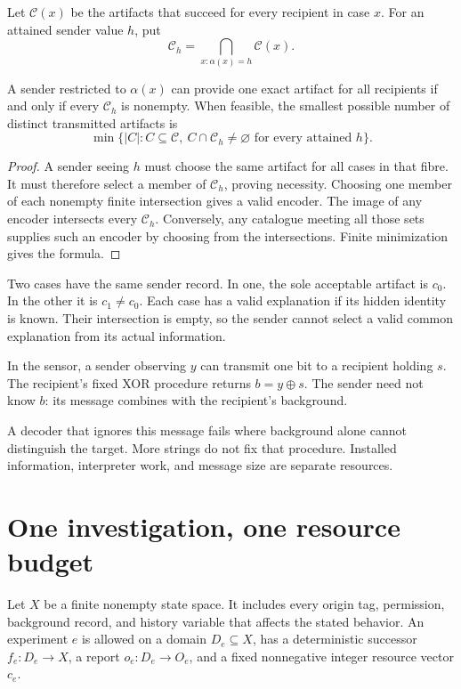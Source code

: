 Let $\mathcal C(x)$ be the artifacts that succeed for every recipient in case $x$. For an attained sender value $h$, put
\[
\mathcal C_h=\bigcap_{x:\alpha(x)=h}\mathcal C(x).
\]

\begin{theorem}\label{r:recipient}
A sender restricted to $\alpha(x)$ can provide one exact artifact for all recipients if and only if every $\mathcal C_h$ is nonempty. When feasible, the smallest possible number of distinct transmitted artifacts is
\[
\min\{|C|:C\subseteq\mathcal C,\ C\cap\mathcal C_h\ne\varnothing
\text{ for every attained }h\}.
\]
\end{theorem}
\begin{proof}
A sender seeing $h$ must choose the same artifact for all cases in that fibre. It must therefore select a member of $\mathcal C_h$, proving necessity. Choosing one member of each nonempty finite intersection gives a valid encoder. The image of any encoder intersects every $\mathcal C_h$. Conversely, any catalogue meeting all those sets supplies such an encoder by choosing from the intersections. Finite minimization gives the formula.
\end{proof}

\begin{counterexample}\label{ce:message}
Two cases have the same sender record. In one, the sole acceptable artifact is $c_0$. In the other it is $c_1\ne c_0$. Each case has a valid explanation if its hidden identity is known. Their intersection is empty, so the sender cannot select a valid common explanation from its actual information.
\end{counterexample}

In the sensor, a sender observing $y$ can transmit one bit to a recipient holding $s$. The recipient's fixed XOR procedure returns $b=y\oplus s$. The sender need not know $b$: its message combines with the recipient's background.

A decoder that ignores this message fails where background alone cannot distinguish the target. More strings do not fix that procedure. Installed information, interpreter work, and message size are separate resources.

\chapter{One investigation, one resource budget}\label{ch:inquiry}
Let $X$ be a finite nonempty state space. It includes every origin tag, permission, background record, and history variable that affects the stated behavior. An experiment $e$ is allowed on a domain $D_e\subseteq X$, has a deterministic successor $f_e:D_e\to X$, a report $o_e:D_e\to O_e$, and a fixed nonnegative integer resource vector $c_e$.

